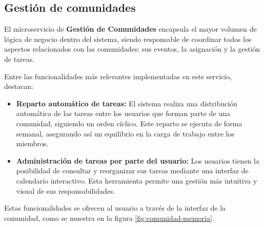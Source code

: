 \newpage


\subsection{Gestión de comunidades}
El microservicio de \textbf{Gestión de Comunidades} encapsula el mayor volumen de lógica de negocio dentro del sistema, siendo responsable de coordinar todos los aspectos relacionados con las comunidades: sus eventos, la asignación y la gestión de tareas.

Entre las funcionalidades más relevantes implementadas en este servicio, destacan:

\begin{itemize}
  \item \textbf{Reparto automático de tareas:}  
  El sistema realiza una distribución automática de las tareas entre los usuarios que forman parte de una comunidad, siguiendo un orden cíclico. Este reparto se ejecuta de forma semanal, asegurando así un equilibrio en la carga de trabajo entre los miembros.

  \item \textbf{Administración de tareas por parte del usuario:}  
  Los usuarios tienen la posibilidad de consultar y reorganizar sus tareas mediante una interfaz de calendario interactivo. Esta herramienta permite una gestión más intuitiva y visual de sus responsabilidades.
\end{itemize}
Estas funcionalidades se ofrecen al usuario a través de la interfaz de la comunidad, como se muestra en la figura \ref{fig:comunidad-memoria}.


